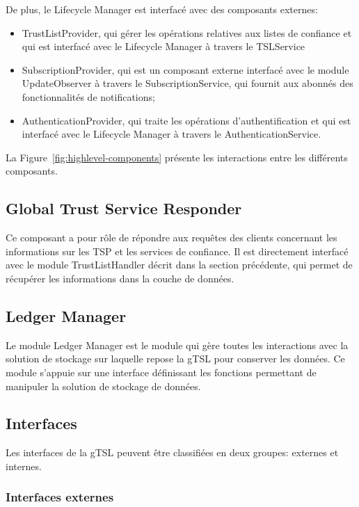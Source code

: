 \documentclass{tnreport}
\begin{document}
De plus, le Lifecycle Manager est interfacé avec des composants externes:
\begin{itemize}
	\item TrustListProvider, qui gérer les opérations relatives aux listes de confiance et qui est interfacé avec le Lifecycle Manager à travers le TSLService
	\item SubscriptionProvider, qui est un composant externe interfacé avec le module UpdateObserver à travers le SubscriptionService, qui fournit aux abonnés des fonctionnalités de notifications;
	\item AuthenticationProvider, qui traite les opérations d'authentification et qui est interfacé avec le Lifecycle Manager à travers le AuthenticationService.
\end{itemize}

La Figure~\ref{fig:highlevel-components} présente les interactions entre les différents composants.

\subsection{Global Trust Service Responder}
Ce composant a pour rôle de répondre aux requêtes des clients concernant les informations sur les TSP et les services de confiance. Il est directement interfacé avec le module TrustListHandler décrit dans la section précédente, qui permet de récupérer les informations dans la couche de données.

\subsection{Ledger Manager}

Le module Ledger Manager est le module qui gère toutes les interactions avec la solution de stockage sur laquelle repose la gTSL pour conserver les données. Ce module s'appuie sur une interface définissant les fonctions permettant de manipuler la solution de stockage de données.

\subsection{Interfaces}

Les interfaces de la gTSL peuvent être classifiées en deux groupes: externes et internes.

\subsubsection{Interfaces externes}
\end{document}
